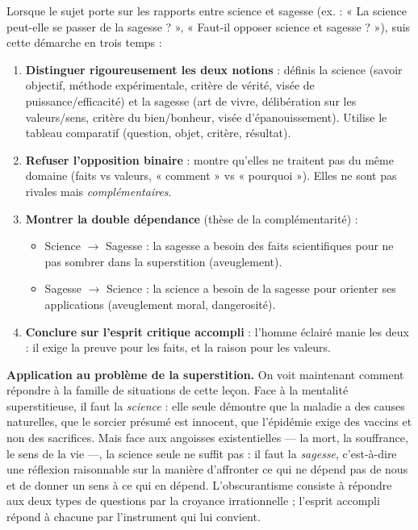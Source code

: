 \documentclass[11pt]{article}
\begin{document}
\begin{methode}
Lorsque le sujet porte sur les rapports entre science et sagesse (ex. : « La science peut-elle se passer de la sagesse ? », « Faut-il opposer science et sagesse ? »), suis cette démarche en trois temps :
\begin{enumerate}
\item \textbf{Distinguer rigoureusement les deux notions} : définis la science (savoir objectif, méthode expérimentale, critère de vérité, visée de puissance/efficacité) et la sagesse (art de vivre, délibération sur les valeurs/sens, critère du bien/bonheur, visée d'épanouissement). Utilise le tableau comparatif (question, objet, critère, résultat).
\item \textbf{Refuser l'opposition binaire} : montre qu'elles ne traitent pas du même domaine (faits vs valeurs, « comment » vs « pourquoi »). Elles ne sont pas rivales mais \emph{complémentaires}.
\item \textbf{Montrer la double dépendance} (thèse de la complémentarité) :
      \begin{itemize}
      \item Science $\rightarrow$ Sagesse : la sagesse a besoin des faits scientifiques pour ne pas sombrer dans la superstition (aveuglement).
      \item Sagesse $\rightarrow$ Science : la science a besoin de la sagesse pour orienter ses applications (aveuglement moral, dangerosité).
      \end{itemize}
\item \textbf{Conclure sur l'esprit critique accompli} : l'homme éclairé manie les deux : il exige la preuve pour les faits, et la raison pour les valeurs.
\end{enumerate}
\end{methode}

\textbf{Application au problème de la superstition.} On voit maintenant comment répondre à la famille de situations de cette leçon. Face à la mentalité superstitieuse, il faut la \emph{science} : elle seule démontre que la maladie a des causes naturelles, que le sorcier présumé est innocent, que l'épidémie exige des vaccins et non des sacrifices. Mais face aux angoisses existentielles — la mort, la souffrance, le sens de la vie —, la science seule ne suffit pas : il faut la \emph{sagesse}, c'est-à-dire une réflexion raisonnable sur la manière d'affronter ce qui ne dépend pas de nous et de donner un sens à ce qui en dépend. L'obscurantisme consiste à répondre aux deux types de questions par la croyance irrationnelle ; l'esprit accompli répond à chacune par l'instrument qui lui convient.
\end{document}
